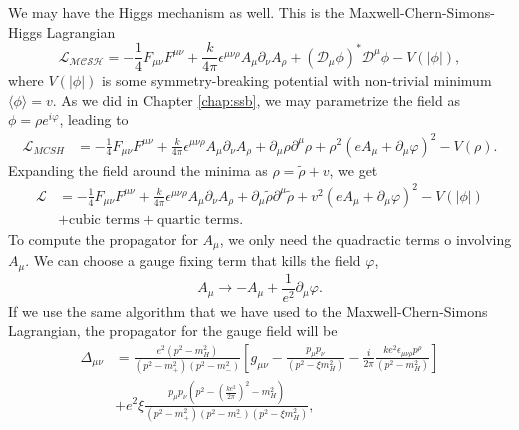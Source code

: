 \documentclass{article}
\begin{document}
We may have the Higgs mechanism as well. This is the Maxwell-Chern-Simons-Higgs Lagrangian
\begin{equation}
	\mathcal{L_{\text{MCSH}}}=-\frac{1}{4}F_{\mu\nu}F^{\mu\nu}+\frac{k}{4\pi}\epsilon^{\mu\nu\rho}A_{\mu}\partial_{\nu}A_{\rho}+(\mathcal{D_{\mu}}\phi)^{*}\mathcal{D}^{\mu}\phi-V(|\phi|),
\end{equation}
where $V(|\phi|)$ is some symmetry-breaking potential with non-trivial minimum $\langle \phi\rangle =v$. As we did in Chapter \ref{chap:ssb}, we may parametrize the field as $\phi = \rho e^{i\varphi}$, leading to
\begin{equation}
	\begin{split}
		\mathcal{L}_{MCSH} &= -\frac{1}{4}F_{\mu\nu}F^{\mu\nu} +\frac{k}{4\pi} \epsilon^{\mu\nu\rho}A_\mu\partial_{\nu}A_\rho + \partial_{\mu}\rho\partial^\mu\rho + \rho^2(eA_\mu+\partial_\mu\varphi)^2 - V(\rho).
	\end{split}
\end{equation}
Expanding the field around the minima as $\rho = \tilde{\rho} + v$, we get 
\begin{equation}
	\begin{split}
		\mathcal{L} &=-\frac{1}{4}F_{\mu\nu}F^{\mu\nu} +\frac{k}{4\pi} \epsilon^{\mu\nu\rho}A_\mu\partial_{\nu}A_\rho + \partial_{\mu}\tilde{\rho}\partial^\mu\tilde{\rho} + v^2(eA_\mu+\partial_\mu\varphi)^2 - V(|\phi|) \\& + \text{cubic terms} + \text{quartic terms.}
	\end{split}
\end{equation}
To compute the propagator for $A_\mu$, we only need the quadractic terms o involving $A_\mu$. We can choose a gauge fixing term that kills the field $\varphi$, 
\begin{equation}
	A_\mu \to - A_\mu + \frac{1}{e^2}\partial_\mu\varphi.
\end{equation}
If we use the same algorithm that we have used to the Maxwell-Chern-Simons Lagrangian, the propagator for the gauge field will be 
\begin{equation}
	\begin{split}
		\Delta_{\mu\nu}&=\frac{e^{2}(p^{2}-m_{H}^{2})}{(p^{2}-m_{+}^{2})(p^{2}-m_{-}^{2})}\left[g_{\mu\nu}-\frac{p_{\mu}p_{\nu}}{(p^{2}-\xi m_{H}^{2})}-\frac{i}{2\pi}\frac{ke^{2}\epsilon_{\mu\nu\rho}p^{\rho}}{(p^{2}-m_{H}^{2})}\right]\\&+e^{2}\xi\frac{p_{\mu}p_{\nu}(p^{2}-(\frac{ke^2}{2\pi})^2-m_{H}^{2})}{(p^{2}-m_{+}^{2})(p^{2}-m_{-}^{2})(p^{2}-\xi m_{H}^{2})},
	\end{split}
\end{equation}
\end{document}
